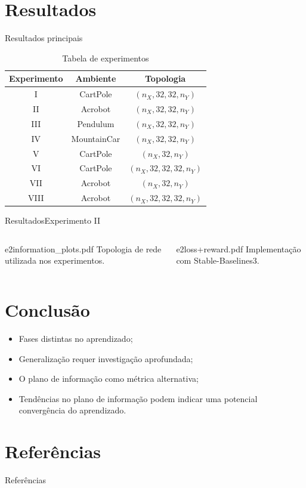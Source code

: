 \documentclass[
11pt,notheorems,hyperref={pdfauthor=Autor}
]{beamer}
\begin{document}
\section{Resultados}
\begin{frame}{Resultados principais}
\pause
\centering
\begin{table}[h]
    \centering
    \caption{Tabela de experimentos}
    \begin{tabular}{ccc}
    \hline
    \textbf{Experimento} & \textbf{Ambiente} & \textbf{Topologia} \\
    \hline
    I       & CartPole     & $(n_X, 32, 32, n_Y)$\\
    II      & Acrobot      & $(n_X, 32, 32, n_Y)$\\
    III     & Pendulum     & $(n_X, 32, 32, n_Y)$\\
    IV      & MountainCar  & $(n_X, 32, 32, n_Y)$\\
    V       & CartPole     & $(n_X, 32, n_Y)$\\
    VI      & CartPole     & $(n_X, 32, 32, 32, n_Y)$\\
    VII     & Acrobot      & $(n_X, 32, n_Y)$\\
    VIII    & Acrobot      & $(n_X, 32, 32, 32, n_Y)$\\
    
    \hline
    \end{tabular}
\end{table}
\end{frame}

\begin{frame}{Resultados}{Experimento II}
\begin{columns}[T]
    \pause
    \FigureWithFallbackCaption
    {e2information_plots.pdf}
    {Topologia de rede utilizada nos experimentos.}

    \pause
    \FigureWithFallbackCaption
    {e2loss+reward.pdf}
    {Implementação com Stable-Baselines3.}
\end{columns}
\end{frame}


\section{Conclusão}
\begin{frame}
    \pause
    \begin{itemize}
        \item Fases distintas no aprendizado; \pause
        \item Generalização requer investigação aprofundada; \pause
        \item O plano de informação como métrica alternativa;\pause
        \item Tendências no plano de informação podem indicar uma potencial convergência do aprendizado.
    \end{itemize}
\end{frame}


\section{Referências}
\begin{frame}[allowframebreaks]{Referências}
    \small
    \setlength{\leftmargini}{1.8em}
    \setlength{\bibitemsep}{0.25\baselineskip}
    \setlength{\bibhang}{1.0em}
    \raggedright
    \justifying
    \printbibliography
\end{frame}
\end{document}

